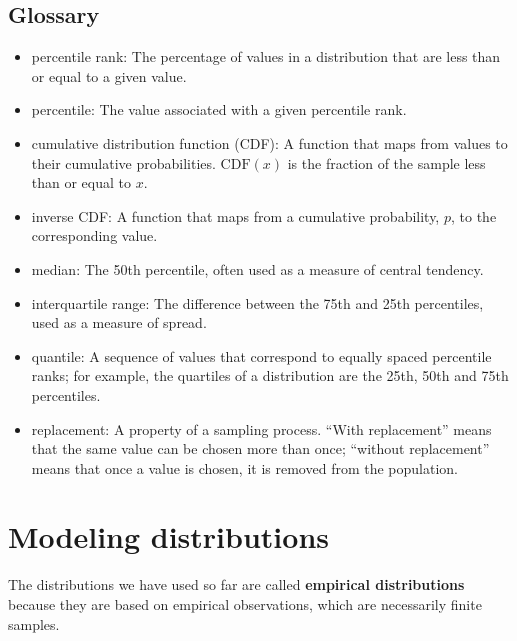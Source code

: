 \documentclass[12pt]{book}
\newcommand{\CDF}{\mathrm{CDF}}
\theoremstyle{exercise}
\begin{document}
\section{Glossary}

\begin{itemize}

\item percentile rank: The percentage of values in a distribution that are
less than or equal to a given value.%

\item percentile: The value associated with a given percentile rank.%

\item cumulative distribution function (CDF): A function that maps
  from values to their cumulative probabilities.  $\CDF(x)$ is the
  fraction of the sample less than or equal to $x$.%
%

\item inverse CDF: A function that maps from a cumulative probability,
  $p$, to the corresponding value.%
%

\item median: The 50th percentile, often used as a measure of central
  tendency.%

\item interquartile range: The difference between
the 75th and 25th percentiles, used as a measure of spread.%

\item quantile: A sequence of values that correspond to equally spaced
percentile ranks; for example, the quartiles of a distribution are
the 25th, 50th and 75th percentiles.%

\item replacement: A property of a sampling process. ``With replacement''
means that the same value can be chosen more than once; ``without
replacement'' means that once a value is chosen, it is removed from
the population.%

\end{itemize}


\chapter{Modeling distributions}%
\label{modeling}

The distributions we have used so far are called {\bf empirical
  distributions} because they are based on empirical observations,
which are necessarily finite samples.%
%
%
%
\end{document}
